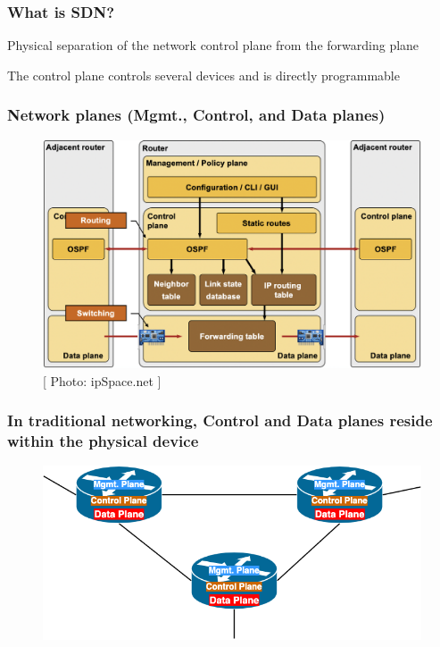 \documentclass{beamer}
\begin{document}
\begin{frame}
  \frametitle{What is SDN?}

  \begin{block}{}
    \centering

    Physical separation of the network control plane from the
    forwarding plane
    
  \end{block}
  \begin{block}{}
    \centering
    The control plane controls several devices and is directly
    programmable
  \end{block}

\end{frame}

\begin{frame}
  \frametitle{Network planes (Mgmt., Control, and Data planes)}
  \begin{figure}
    \begin{center}
      \includegraphics[scale=0.2]{images/sdn-7}
    \end{center}
    
    \caption{\small{[ Photo: ipSpace.net ]}}
  \end{figure}
\end{frame}
\begin{frame}
  \frametitle{In traditional networking, Control and Data planes
    reside within the physical device}
  \begin{figure}
    \begin{center}
      \includegraphics[scale=0.45]{images/sdn-8}
    \end{center}
  \end{figure}
\end{frame}
\end{document}

